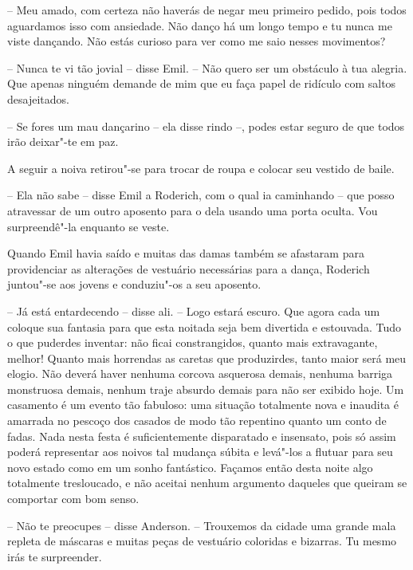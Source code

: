 -- Meu amado, com certeza não haverás de negar meu primeiro pedido,
pois todos aguardamos isso com ansiedade. Não danço há um longo tempo e
tu nunca me viste dançando. Não estás curioso para ver como me saio
nesses movimentos?

-- Nunca te vi tão jovial -- disse Emil. -- Não quero ser um obstáculo à
tua alegria. Que apenas ninguém demande de mim que eu faça papel de
ridículo com saltos desajeitados.

-- Se fores um mau dançarino -- ela disse rindo --, podes estar seguro
de que todos irão deixar"-te em paz.

A seguir a noiva retirou"-se para trocar de roupa e colocar seu vestido
de baile.

-- Ela não sabe -- disse Emil a Roderich, com o qual ia caminhando -- 
que posso atravessar de um outro aposento para o dela usando uma porta
oculta. Vou surpreendê"-la enquanto se veste.

Quando Emil havia saído e muitas das damas também se afastaram para
providenciar as alterações de vestuário necessárias para a dança,
Roderich juntou"-se aos jovens e conduziu"-os a seu aposento.

-- Já está entardecendo -- disse ali. -- Logo estará escuro. Que agora
cada um coloque sua fantasia para que esta noitada seja bem divertida e
estouvada. Tudo o que puderdes inventar: não ficai constrangidos,
quanto mais extravagante, melhor! Quanto mais horrendas as caretas que
produzirdes, tanto maior será meu \mbox{elogio}. Não deverá haver nenhuma
corcova asquerosa demais, nenhuma barriga monstruosa demais, nenhum
traje absurdo demais para não ser exibido hoje. Um casamento é um
evento tão fabuloso: uma situação totalmente nova e inaudita é amarrada
no pescoço dos casados de modo tão repentino quanto um conto de fadas.
Nada nesta festa é suficientemente disparatado e insensato, pois só
assim poderá representar aos noivos tal mudança súbita e levá"-los a
flutuar para seu novo estado como em um sonho fantástico. Façamos então
desta noite algo totalmente tresloucado, e não aceitai nenhum argumento
daqueles que queiram se comportar com bom senso.

-- Não te preocupes -- disse Anderson. -- Trouxemos da cidade uma grande
mala repleta de máscaras e muitas peças de vestuário coloridas e
bizarras. Tu mesmo irás te surpreender.

